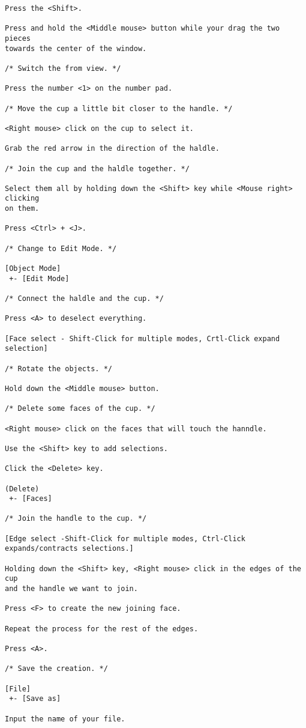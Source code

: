 \begin{verbatim}
Press the <Shift>.

Press and hold the <Middle mouse> button while your drag the two pieces
towards the center of the window.

/* Switch the from view. */ 

Press the number <1> on the number pad. 

/* Move the cup a little bit closer to the handle. */

<Right mouse> click on the cup to select it.

Grab the red arrow in the direction of the haldle.

/* Join the cup and the haldle together. */

Select them all by holding down the <Shift> key while <Mouse right> clicking
on them.

Press <Ctrl> + <J>.

/* Change to Edit Mode. */

[Object Mode]
 +- [Edit Mode]

/* Connect the haldle and the cup. */

Press <A> to deselect everything.

[Face select - Shift-Click for multiple modes, Crtl-Click expand selection]

/* Rotate the objects. */

Hold down the <Middle mouse> button.

/* Delete some faces of the cup. */

<Right mouse> click on the faces that will touch the hanndle.

Use the <Shift> key to add selections.

Click the <Delete> key.

(Delete)
 +- [Faces]

/* Join the handle to the cup. */

[Edge select -Shift-Click for multiple modes, Ctrl-Click expands/contracts selections.]

Holding down the <Shift> key, <Right mouse> click in the edges of the cup
and the handle we want to join.

Press <F> to create the new joining face.

Repeat the process for the rest of the edges.

Press <A>.

/* Save the creation. */

[File]
 +- [Save as]

Input the name of your file.


\end{verbatim}
